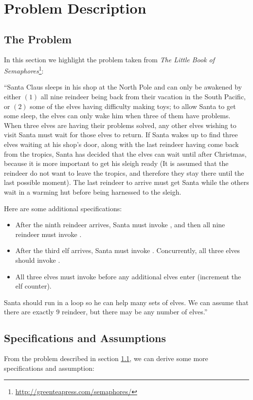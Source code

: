 \chapter{Problem Description}
\label{chap:problem}

\section{The Problem}
\label{sec:problem}
In this section we highlight the problem taken from
\textit{The Little Book of Semaphores}\footnote{\url{http://greenteapress.com/semaphores/}}:

``Santa Claus sleeps in his shop at the North Pole and can only be awakened by
either $(1)$ all nine reindeer being back from their vacation in the South
Pacific, or $(2)$ some of the elves having difficulty making toys; to allow Santa
to get some sleep, the elves can only wake him when three of them have
problems. When three elves are having their problems solved, any other elves
wishing to visit Santa must wait for those elves to return. If Santa wakes up
to find three elves waiting at his shop’s door, along with the last reindeer
having come back from the tropics, Santa has decided that the elves can wait
until after Christmas, because it is more important to get his sleigh ready
(It is assumed that the reindeer do not want to leave the tropics, and
therefore they stay there until the last possible moment). The last reindeer
to arrive must get Santa while the others wait in a warming hut before being
harnessed to the sleigh.

Here are some additional specifications:

\begin{itemize}
\item After the ninth reindeer arrives, Santa must invoke , and
then all nine reindeer must invoke .
\item After the third elf arrives, Santa must invoke . Concurrently,
all three elves should invoke .
\item All three elves must invoke  before any additional elves enter
(increment the elf counter).
\end{itemize}

Santa should run in a loop so he can help many sets of elves. We can assume
that there are exactly $9$ reindeer, but there may be any number of elves.''

\section{Specifications and Assumptions}
\label{sec:specifications}
From the problem described in section \ref{sec:problem}, we can derive some
more specifications and assumption:

